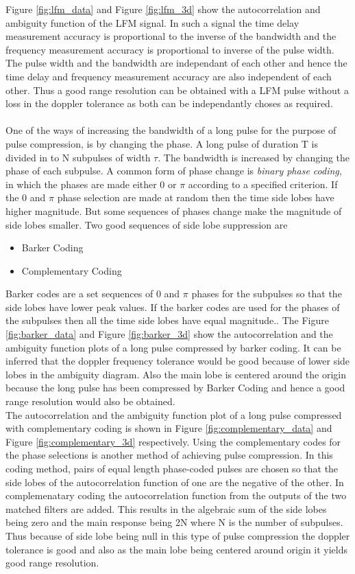 \documentclass{article}
\begin{document}
Figure \ref{fig:lfm_data} and Figure \ref{fig:lfm_3d} show the autocorrelation and ambiguity function of the LFM signal. In such a signal the time delay measurement accuracy is proportional to the inverse of the bandwidth and the frequency measurement accuracy is proportional to inverse of the pulse width.  The pulse width and the bandwidth are independant of each other and hence the time delay and frequency measurement accuracy are also independent of each other. Thus a good range resolution can be obtained with a LFM pulse without a loss in the doppler tolerance as both can be independantly choses as required.\\
\\
One of the ways of increasing the bandwidth of a long pulse for the purpose of pulse compression, is by changing the phase. A long pulse of duration T is divided in to N subpulses of width $\tau$. The bandwidth is increased by changing the phase of each subpulse. A common form of phase change is \textit{binary phase coding}, in which the phases are made either 0 or $\pi$ according to a specified criterion. If the 0 and $\pi$ phase selection are made at random then the time side lobes have higher magnitude. But some sequences of phases change make the magnitude of side lobes smaller. Two good sequences of side lobe suppression are 
\begin{itemize}
\item Barker Coding
\item Complementary Coding
\end{itemize} 

Barker codes are a set sequences of 0 and $\pi$ phases for the subpulses so that the side lobes have lower peak values. If the barker codes are used for the phases of the subpulses then all the time side lobes have equal magnitude.\cite{Skolnik:2001irs}. The Figure \ref{fig:barker_data} and Figure \ref{fig:barker_3d} show the autocorrelation and the ambiguity function plots of a long pulse compressed by barker coding. It can be inferred that the doppler frequency tolerance would be good because of lower side lobes in the ambiguity diagram. Also the main lobe is centered around the origin because the long pulse has been compressed by Barker Coding and hence a good range resolution would also be obtained.\\

The autocorrelation and the ambiguity function plot of a long pulse compressed with complementary coding is shown in Figure \ref{fig:complementary_data} and Figure \ref{fig:complementary_3d} respectively. Using the complementary codes for the phase selections is another method of achieving pulse compression. In this coding method, pairs of equal length phase-coded pulses are chosen so that the side lobes of the autocorrelation function of one are the negative of the other. In complemenatary coding  the autocorrelation function from the outputs of the two matched filters are added. This results in the algebraic sum of the side lobes being zero and the main response being 2N where N is the number of subpulses. Thus because of side lobe being null in this type of pulse compression the doppler tolerance is good and also as the main lobe being centered around origin it yields good range resolution.
\end{document}

